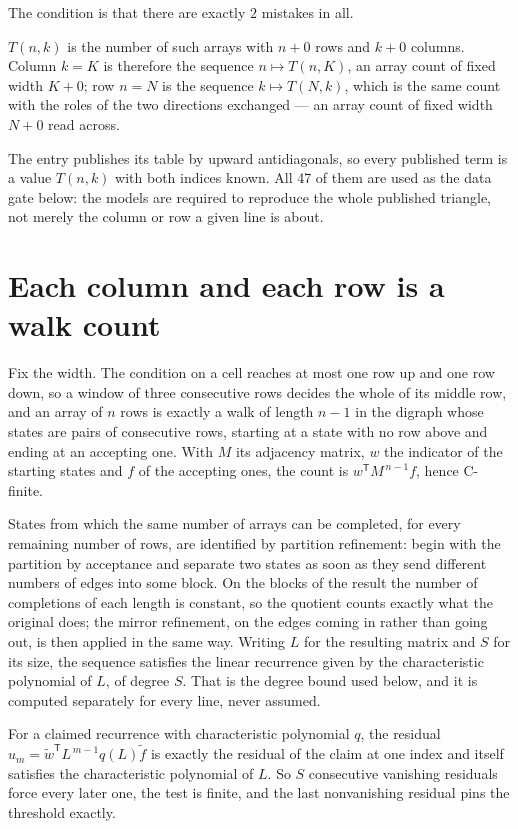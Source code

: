 \documentclass[11pt]{article}
\theoremstyle{definition}
\begin{document}
The condition is that there are exactly $2$ mistakes in all.

$T(n,k)$ is the number of such arrays with $n + 0$ rows and $k + 0$ columns. Column $k = K$ is therefore the sequence $n \mapsto T(n,K)$, an array count of fixed width $K + 0$; row $n = N$ is the sequence $k \mapsto T(N,k)$, which is the same count with the roles of the two directions exchanged --- an array count of fixed width $N + 0$ read across.

The entry publishes its table by upward antidiagonals, so every published term is a value $T(n,k)$ with both indices known. All 47 of them are used as the data gate below: the models are required to reproduce the whole published triangle, not merely the column or row a given line is about.

\section{Each column and each row is a walk count}

Fix the width. The condition on a cell reaches at most one row up and one row down, so a window of three consecutive rows decides the whole of its middle row, and an array of $n$ rows is exactly a walk of length $n-1$ in the digraph whose states are pairs of consecutive rows, starting at a state with no row above and ending at an accepting one. With $M$ its adjacency matrix, $w$ the indicator of the starting states and $f$ of the accepting ones, the count is $w^{\mathsf T}M^{\,n-1}f$, hence C-finite.

States from which the same number of arrays can be completed, for every remaining number of rows, are identified by partition refinement: begin with the partition by acceptance and separate two states as soon as they send different numbers of edges into some block. On the blocks of the result the number of completions of each length is constant, so the quotient counts exactly what the original does; the mirror refinement, on the edges coming in rather than going out, is then applied in the same way. Writing $L$ for the resulting matrix and $S$ for its size, the sequence satisfies the linear recurrence given by the characteristic polynomial of $L$, of degree $S$. That is the degree bound used below, and it is computed separately for every line, never assumed.

For a claimed recurrence with characteristic polynomial $q$, the residual $u_m = \tilde w^{\mathsf T}L^{\,m-1}q(L)\tilde f$ is exactly the residual of the claim at one index and itself satisfies the characteristic polynomial of $L$. So $S$ consecutive vanishing residuals force every later one, the test is finite, and the last nonvanishing residual pins the threshold exactly.
\end{document}
